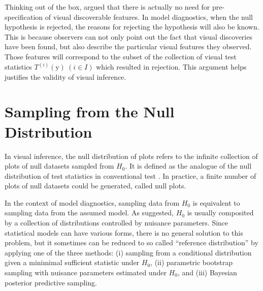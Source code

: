 \documentclass{monashthesis}
\theoremstyle{definition}
\theoremstyle{definition}
\theoremstyle{definition}
\theoremstyle{definition}
\theoremstyle{remark}
\begin{document}
Thinking out of the box, \textcite{buja_statistical_2009} argued that there is actually no need for pre-specification of visual discoverable features. In model diagnostics, when the null hypothesis is rejected, the reasons for rejecting the hypothesis will also be known. This is because observers can not only point out the fact that visual discoveries have been found, but also describe the particular visual features they observed. Those features will correspond to the subset of the collection of visual test statistics \(T^{(i)}(\boldsymbol{\mathrm{y}})~(i \in I)\) which resulted in rejection. This argument helps justifies the validity of visual inference.

\hypertarget{se:sampling-from-null}{%
\section{Sampling from the Null Distribution}\label{se:sampling-from-null}}

In visual inference, the null distribution of plots refers to the infinite collection of plots of null datasets sampled from \(H_0\). It is defined as the analogue of the null distribution of test statistics in conventional test \autocite{buja_statistical_2009}. In practice, a finite number of plots of null datasets could be generated, called null plots.

In the context of model diagnostics, sampling data from \(H_0\) is equivalent to sampling data from the assumed model. As \textcite{buja_statistical_2009} suggested, \(H_0\) is usually composited by a collection of distributions controlled by nuisance parameters. Since statistical models can have various forms, there is no general solution to this problem, but it sometimes can be reduced to so called ``reference distribution'' by applying one of the three methods: (i) sampling from a conditional distribution given a minimimal sufficient statistic under \(H_0\), (ii) parametric bootstrap sampling with nuisance parameters estimated under \(H_0\), and (iii) Bayesian posterior predictive sampling.
\end{document}
